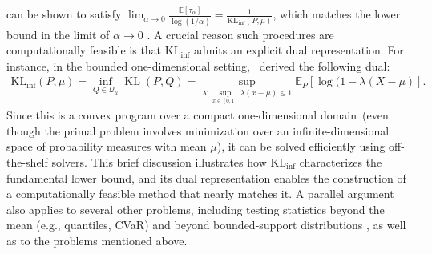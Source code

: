 \documentclass{article}
\theoremstyle{plain}
\theoremstyle{definition}
\newcommand{\KLinf}{\operatorname{KL_{inf}}}
\newcommand{\KL}{\operatorname{KL}}
\newcommand{\calQ}{\mathcal Q}
\begin{document}
can be shown to satisfy $\lim_{\alpha\rightarrow 0}\frac{\mathbb{E}[\tau_{\alpha}]}{\log(1/\alpha)} = \frac{1}{\KLinf(P,\mu)}$, which matches the lower bound in the limit of $\alpha \to 0$ \citep{agrawal2020optimal,jourdan2022top}. A crucial reason such procedures are computationally feasible is that $\KLinf$ admits an explicit dual representation. For instance, in the bounded one-dimensional setting,~\citet{honda2010asymptotically} derived the following dual: 
\begin{align}
\KLinf(P, \mu) = \inf_{Q \in \calQ_\mu} \KL(P, Q) = \sup_{\lambda:  \sup_{x \in [0,1]}\lambda(x-\mu) \leq 1} \mathbb{E}_P[\log(1 - \lambda(X-\mu)]. \label{eq:klinf-one-dim}
\end{align}
Since this is a convex program over a compact one-dimensional domain~(even though the primal problem involves minimization over an infinite-dimensional space of probability measures with mean $\mu$), it can be solved efficiently using off-the-shelf solvers. This brief discussion illustrates how $\KLinf$ characterizes the fundamental lower bound, and its dual representation enables the construction of a computationally feasible method that nearly matches it. A parallel argument also applies to several other problems, including testing statistics beyond the mean (e.g., quantiles, CVaR) and beyond bounded-support distributions \citep{agrawal2021regret,agrawal2021optimal}, as well as to the problems mentioned above. 
\end{document}
